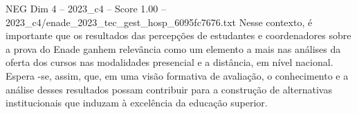\begin{textsample}{NEG Dim 4 – 2023\_c4 – Score 1.00 – 2023\_c4/enade\_2023\_tec\_gest\_hosp\_6095fc7676.txt}
Nesse contexto, é importante que os resultados das percepções de estudantes e coordenadores sobre a prova do Enade ganhem relevância como um elemento a mais nas análises da oferta dos cursos nas modalidades presencial e a distância, em nível nacional.
Espera -se, assim, que, em uma visão formativa de avaliação, o conhecimento e a análise desses resultados possam contribuir para a construção de alternativas institucionais que induzam à excelência da educação superior.

\end{textsample}
